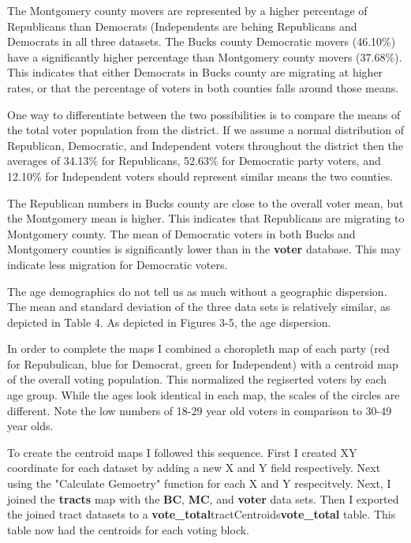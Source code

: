\documentclass[12pt]{article}
\begin{document}
The Montgomery county movers are represented by a higher percentage of Republicans than Democrats (Independents are behing Republicans and Democrats in all three datasets.  The Bucks county Democratic movers (46.10\%) have a significantly higher percentage than Montgomery county movers (37.68\%).  This indicates that either Democrats in Bucks county are migrating at higher rates, or that the percentage of voters in both counties falls around those means.

One way to differentiate between the two possibilities is to compare the means of the total voter population from the district.  If we assume a normal distribution of Republican, Democratic, and Independent voters throughout the district then the averages of 34.13\% for Republicans, 52.63\% for Democratic party voters, and 12.10\% for Independent voters should represent similar means the two counties.  

The Republican numbers in Bucks county are close to the overall voter mean, but the Montgomery mean is higher.  This indicates that Republicans are migrating to Montgomery county.  The mean of Democratic voters in both Bucks and Montgomery counties is significantly lower than in the \textbf{voter} database.  This may indicate less migration for Democratic voters.

The age demographics do not tell us as much without a geographic dispersion.  The mean and standard deviation of the three data sets is relatively similar, as depicted in Table 4.  As depicted in Figures 3-5, the age dispersion.  

In order to complete the maps I combined a choropleth map of each party (red for Repubulican, blue for Democrat, green for Independent) with a centroid map of the overall voting population.  This normalized the regiserted voters by each age group.  While the ages look identical in each map, the scales of the circles are different.  Note the low numbers of 18-29 year old voters in comparison to 30-49 year olds.

To create the centroid maps I followed this sequence.  First I created XY coordinate for each dataset by adding a new X and Y field respectively.  Next using the "Calculate Gemoetry" function for each X and Y respecitvely.  Next, I joined the \textbf{tracts} map with the \textbf{BC}, \textbf{MC}, and \textbf{voter} data sets.  Then I exported the joined tract datasets to a \textbf{vote\_total}tractCentroids\textbf{vote\_total} table.  This table now had the centroids for each voting block.  
\end{document}
